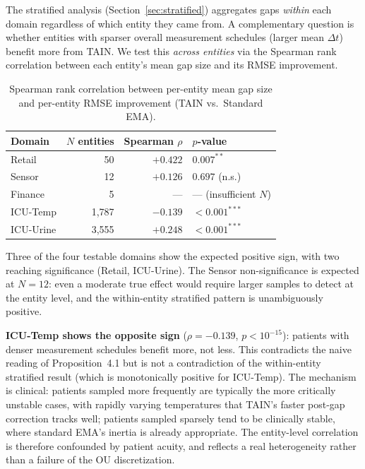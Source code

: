 \documentclass[11pt,a4paper]{article}
\begin{document}
The stratified analysis (Section~\ref{sec:stratified}) aggregates gaps
\emph{within} each domain regardless of which entity they came from. A
complementary question is whether entities with sparser overall measurement
schedules (larger mean $\Delta t$) benefit more from TAIN. We test this
\emph{across entities} via the Spearman rank correlation between each entity's
mean gap size and its RMSE improvement.

\begin{table}[h]
\centering
\caption{Spearman rank correlation between per-entity mean gap size and
per-entity RMSE improvement (TAIN vs.\ Standard EMA).}
\label{tab:spearman}
\begin{tabular}{lrrl}
\toprule
Domain & $N$ entities & Spearman $\rho$ & $p$-value \\
\midrule
Retail    & 50    & $+0.422$ & $0.007^{**}$ \\
Sensor    & 12    & $+0.126$ & $0.697$ (n.s.) \\
Finance   & 5     & --- & --- (insufficient $N$) \\
ICU-Temp  & 1{,}787 & $-0.139$ & $< 0.001^{***}$ \\
ICU-Urine & 3{,}555 & $+0.248$ & $< 0.001^{***}$ \\
\bottomrule
\end{tabular}
\end{table}

Three of the four testable domains show the expected positive sign, with
two reaching significance (Retail, ICU-Urine). The Sensor non-significance is
expected at $N = 12$: even a moderate true effect would require larger samples
to detect at the entity level, and the within-entity stratified pattern is
unambiguously positive.

\textbf{ICU-Temp shows the opposite sign} ($\rho = -0.139$, $p < 10^{-15}$):
patients with denser measurement schedules benefit more, not less. This
contradicts the naive reading of Proposition~4.1 but is not a contradiction of
the within-entity stratified result (which is monotonically positive for
ICU-Temp). The mechanism is clinical: patients sampled more frequently are
typically the more critically unstable cases, with rapidly varying temperatures
that TAIN's faster post-gap correction tracks well; patients sampled sparsely
tend to be clinically stable, where standard EMA's inertia is already
appropriate. The entity-level correlation is therefore confounded by patient
acuity, and reflects a real heterogeneity rather than a failure of the OU
discretization.
\end{document}
